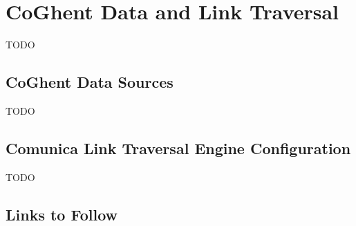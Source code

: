 \chapter{CoGhent Data and Link Traversal}
\label{chap:coghent_link_traversal}

TODO

\section{CoGhent Data Sources}
\label{sec:coghent_data_sources}

TODO

\section{Comunica Link Traversal Engine Configuration}
\label{sec:comunica_link_traversal_engine_configuration}

TODO

\section{Links to Follow}
\label{sec:links_to_follow}